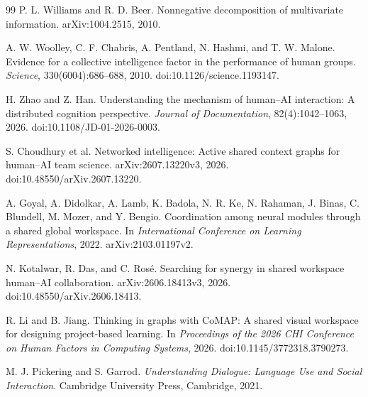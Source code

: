 \documentclass[11pt,letterpaper]{article}
\theoremstyle{plain}
\theoremstyle{definition}
\begin{document}
\begin{thebibliography}{99}
P. L. Williams and R. D. Beer.
\newblock Nonnegative decomposition of multivariate information.
\newblock arXiv:1004.2515, 2010.

A. W. Woolley, C. F. Chabris, A. Pentland, N. Hashmi, and T. W. Malone.
\newblock Evidence for a collective intelligence factor in the performance of human groups.
\newblock \emph{Science}, 330(6004):686--688, 2010.
\newblock doi:10.1126/science.1193147.

H. Zhao and Z. Han.
\newblock Understanding the mechanism of human--AI interaction: A distributed cognition perspective.
\newblock \emph{Journal of Documentation}, 82(4):1042--1063, 2026.
\newblock doi:10.1108/JD-01-2026-0003.


S. Choudhury et al.
\newblock Networked intelligence: Active shared context graphs for human--AI team science.
\newblock arXiv:2607.13220v3, 2026.
\newblock doi:10.48550/arXiv.2607.13220.

A. Goyal, A. Didolkar, A. Lamb, K. Badola, N. R. Ke, N. Rahaman, J. Binas,
C. Blundell, M. Mozer, and Y. Bengio.
\newblock Coordination among neural modules through a shared global workspace.
\newblock In \emph{International Conference on Learning Representations}, 2022.
\newblock arXiv:2103.01197v2.

N. Kotalwar, R. Das, and C. Ros\'e.
\newblock Searching for synergy in shared workspace human--AI collaboration.
\newblock arXiv:2606.18413v3, 2026.
\newblock doi:10.48550/arXiv.2606.18413.

R. Li and B. Jiang.
\newblock Thinking in graphs with CoMAP: A shared visual workspace for designing project-based learning.
\newblock In \emph{Proceedings of the 2026 CHI Conference on Human Factors in Computing Systems}, 2026.
\newblock doi:10.1145/3772318.3790273.

M. J. Pickering and S. Garrod.
\newblock \emph{Understanding Dialogue: Language Use and Social Interaction}.
\newblock Cambridge University Press, Cambridge, 2021.

\end{thebibliography}
\end{document}
